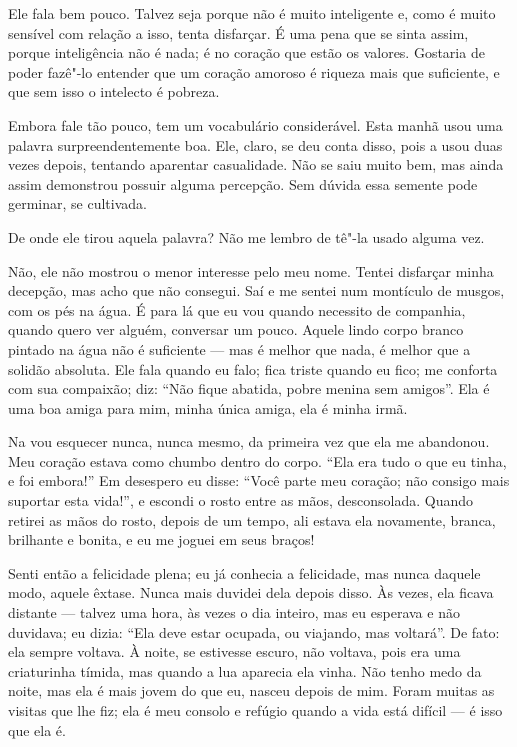 Ele fala bem pouco. Talvez seja porque não é muito inteligente e, 
como é muito sensível com relação a isso, tenta disfarçar. 
É uma pena que se sinta assim, porque inteligência não é nada; 
é no coração que estão os valores. Gostaria de poder fazê"-lo entender 
que um coração amoroso é riqueza mais que suficiente, e que sem isso 
o intelecto é pobreza.

Embora fale tão pouco, tem um vocabulário considerável. Esta manhã
usou uma palavra surpreendentemente boa. Ele, claro, se deu conta
disso, pois a usou duas vezes depois, tentando aparentar casualidade. 
Não se saiu muito bem, mas ainda assim demonstrou possuir alguma 
percepção. Sem dúvida essa semente pode germinar, se cultivada.

De onde ele tirou aquela palavra? Não me lembro de tê"-la usado alguma vez.

Não, ele não mostrou o menor interesse pelo meu nome. Tentei disfarçar minha
decepção, mas acho que não consegui. Saí e me sentei num montículo de
musgos, com os pés na água. É para lá que eu vou quando necessito de
companhia, quando quero ver alguém, conversar um pouco. Aquele lindo
corpo branco pintado na água não é suficiente --- mas é melhor que nada, é
melhor que a solidão absoluta. Ele fala quando eu falo; fica triste quando eu
fico; me conforta com sua compaixão; diz: “Não fique abatida, pobre
menina sem amigos”. Ela é uma boa amiga para mim,
minha única amiga, ela é minha irmã.

Na vou esquecer nunca, nunca mesmo, da primeira vez que ela me abandonou. Meu
coração estava como chumbo dentro do corpo. “Ela era tudo o que eu tinha, e
foi embora!” Em desespero eu disse: “Você parte meu coração; não
consigo mais suportar esta vida!”, e escondi o rosto entre as mãos,
desconsolada. Quando retirei as mãos do rosto, depois de um tempo, ali estava ela
novamente, branca, brilhante e bonita, e eu me joguei em seus braços!

Senti então a felicidade plena; eu já conhecia a felicidade, mas nunca daquele modo, 
aquele êxtase. Nunca mais duvidei dela depois disso. Às
vezes, ela ficava distante --- talvez uma hora, às vezes o dia inteiro, mas eu
esperava e não duvidava; eu dizia: “Ela deve estar ocupada, ou viajando,
mas voltará”. De fato: ela sempre voltava. À noite, se estivesse
escuro, não voltava, pois era uma criaturinha tímida, mas quando a lua
aparecia ela vinha. Não tenho medo da noite, mas ela é mais jovem do que
eu, nasceu depois de mim. Foram muitas as visitas que lhe fiz; ela é meu
consolo e refúgio quando a vida está difícil --- é isso que ela é.

